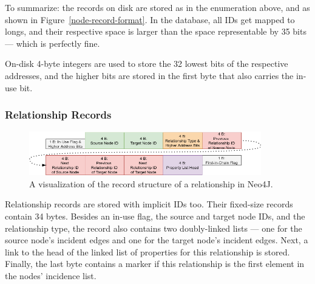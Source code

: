         To summarize: the records on disk are stored as in the enumeration above, and as shown in Figure~\ref{node-record-format}. 
        In the database, all IDs get mapped to longs, and their respective space is larger than the space representable by 35 bits --- which is perfectly fine.
        
        On-disk 4-byte integers are used to store the 32 lowest bits of the respective addresses, and the higher bits are stored in the first byte that also carries the in-use bit.
    
    \subsubsection*{Relationship Records}\label{n4j-rel}
        \begin{figure}[htp]
            \begin{center}
                \includegraphics[keepaspectratio,height=0.9\textheight,width=0.9\textwidth]{img/04-databases/relationship_record.png}
            \end{center}
            \caption{A visualization of the record structure of a relationship in Neo4J.}
            \label{rel_record}
        \end{figure}
            
        Relationship records are stored with implicit IDs too. 
        Their fixed-size records contain 34 bytes.
        Besides an in-use flag, the source and target node IDs, and the relationship type, the record also contains two doubly-linked lists --- one for the source node's incident edges and one for the target node's incident edges.
        Next, a link to the head of the linked list of properties for this relationship is stored.
        Finally, the last byte contains a marker if this relationship is the first element in the nodes' incidence list.
        
